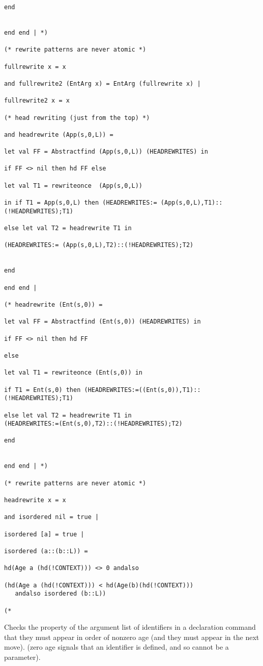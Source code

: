 \documentclass{article}
\begin{document}
\begin{verbatim}
end


end end | *)

(* rewrite patterns are never atomic *)

fullrewrite x = x

and fullrewrite2 (EntArg x) = EntArg (fullrewrite x) |

fullrewrite2 x = x

(* head rewriting (just from the top) *)

and headrewrite (App(s,0,L)) =

let val FF = Abstractfind (App(s,0,L)) (HEADREWRITES) in

if FF <> nil then hd FF else

let val T1 = rewriteonce  (App(s,0,L))

in if T1 = App(s,0,L) then (HEADREWRITES:= (App(s,0,L),T1)::(!HEADREWRITES);T1)

else let val T2 = headrewrite T1 in

(HEADREWRITES:= (App(s,0,L),T2)::(!HEADREWRITES);T2)


end

end end |

(* headrewrite (Ent(s,0)) = 

let val FF = Abstractfind (Ent(s,0)) (HEADREWRITES) in

if FF <> nil then hd FF

else

let val T1 = rewriteonce (Ent(s,0)) in

if T1 = Ent(s,0) then (HEADREWRITES:=((Ent(s,0)),T1)::(!HEADREWRITES);T1)

else let val T2 = headrewrite T1 in
(HEADREWRITES:=(Ent(s,0),T2)::(!HEADREWRITES);T2)

end


end end | *)

(* rewrite patterns are never atomic *)

headrewrite x = x

and isordered nil = true |

isordered [a] = true |

isordered (a::(b::L)) = 

hd(Age a (hd(!CONTEXT))) <> 0 andalso

(hd(Age a (hd(!CONTEXT))) < hd(Age(b)(hd(!CONTEXT))) 
   andalso isordered (b::L))

(*

\end{verbatim}

Checks the property of the argument list of identifiers in a declaration command that they must appear in order
of nonzero age (and they must appear in the next move).  (zero age signals that an identifier is defined, and so cannot be a parameter).
\end{document}
